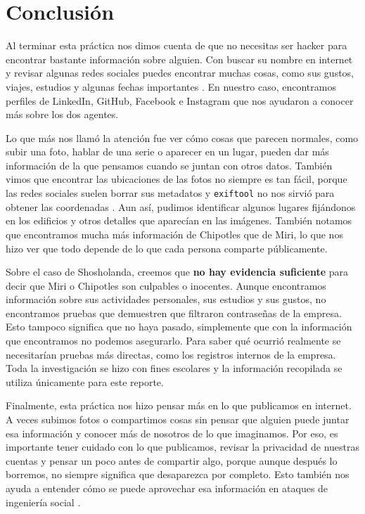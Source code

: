 
\section{Conclusión}

Al terminar esta práctica nos dimos cuenta de que no necesitas ser hacker para encontrar bastante información sobre alguien. Con buscar su nombre en internet y revisar algunas redes sociales puedes encontrar muchas cosas, como sus gustos, viajes, estudios y algunas fechas importantes \cite{cwsi_osint}. En nuestro caso, encontramos perfiles de LinkedIn, GitHub, Facebook e Instagram que nos ayudaron a conocer más sobre los dos agentes.

Lo que más nos llamó la atención fue ver cómo cosas que parecen normales, como subir una foto, hablar de una serie o aparecer en un lugar, pueden dar más información de la que pensamos cuando se juntan con otros datos. También vimos que encontrar las ubicaciones de las fotos no siempre es tan fácil, porque las redes sociales suelen borrar sus metadatos y \texttt{exiftool} no nos sirvió para obtener las coordenadas \cite{exiftool}. Aun así, pudimos identificar algunos lugares fijándonos en los edificios y otros detalles que aparecían en las imágenes. También notamos que encontramos mucha más información de Chipotles que de Miri, lo que nos hizo ver que todo depende de lo que cada persona comparte públicamente.

Sobre el caso de Shosholanda, creemos que \textbf{no hay evidencia suficiente} para decir que Miri o Chipotles son culpables o inocentes. Aunque encontramos información sobre sus actividades personales, sus estudios y sus gustos, no encontramos pruebas que demuestren que filtraron contraseñas de la empresa. Esto tampoco significa que no haya pasado, simplemente que con la información que encontramos no podemos asegurarlo. Para saber qué ocurrió realmente se necesitarían pruebas más directas, como los registros internos de la empresa. Toda la investigación se hizo con fines escolares y la información recopilada se utiliza únicamente para este reporte.

Finalmente, esta práctica nos hizo pensar más en lo que publicamos en internet. A veces subimos fotos o compartimos cosas sin pensar que alguien puede juntar esa información y conocer más de nosotros de lo que imaginamos. Por eso, es importante tener cuidado con lo que publicamos, revisar la privacidad de nuestras cuentas y pensar un poco antes de compartir algo, porque aunque después lo borremos, no siempre significa que desaparezca por completo. Esto también nos ayuda a entender cómo se puede aprovechar esa información en ataques de ingeniería social \cite{crowdstrike_social}.
